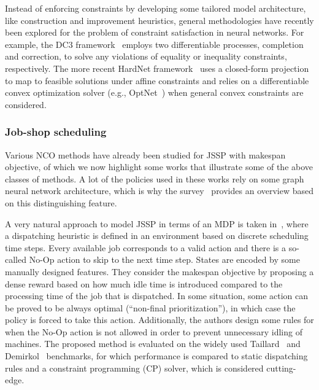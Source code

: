 \documentclass{article}
\theoremstyle{definition}
\theoremstyle{plain}
\begin{document}

Instead of enforcing constraints by developing some tailored model architecture,
like construction and improvement heuristics, general methodologies have
recently been explored for the problem of constraint satisfaction in neural
networks. For example, the DC3 framework~\cite{dontiDC3LearningMethod2021}
employs two differentiable processes, completion and correction, to solve any
violations of equality or inequality constraints, respectively. The more recent
HardNet framework~\cite{minHardConstrainedNeuralNetworks2024} uses a closed-form
projection to map to feasible solutions under affine constraints and relies on a
differentiable convex optimization solver (e.g.,
OptNet~\cite{amosOptNetDifferentiableOptimization2021}) when general convex
constraints are considered.

\subsubsection{Job-shop scheduling}

Various NCO methods have already been studied for JSSP with makespan objective,
of which we now highlight some works that illustrate some of the above classes
of methods. A lot of the policies used in these works rely on some graph neural
network architecture, which is why the survey~\cite{smitGraphNeuralNetworks2024}
provides an overview based on this distinguishing feature.

A very natural approach to model JSSP in terms of an MDP is taken
in~\cite{tasselReinforcementLearningEnvironment2021}, where a dispatching
heuristic is defined in an environment based on discrete scheduling time steps.
%
Every available job corresponds to a valid action and there is a so-called No-Op
action to skip to the next time step. States are encoded by some manually
designed features. They consider the makespan objective by proposing a dense
reward based on how much idle time is introduced compared to the processing time
of the job that is dispatched.
%
In some situation, some action can be proved to be always optimal (``non-final
prioritization''), in which case the policy is forced to take this action.
Additionally, the authors design some rules for when the No-Op action is not
allowed in order to prevent unnecessary idling of machines.
%
The proposed method is evaluated on the widely used
Taillard~\cite{taillardBenchmarksBasicScheduling1993} and
Demirkol~\cite{DEMIRKOL1998137} benchmarks, for which performance is compared to
static dispatching rules and a constraint programming (CP) solver, which is
considered cutting-edge.
\end{document}
